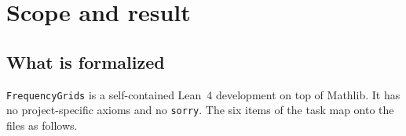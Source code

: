 \documentclass[11pt,a4paper]{article}
\newcommand{\code}[1]{\texttt{#1}}
\theoremstyle{definition}
\theoremstyle{remark}
\begin{document}
\begin{abstract}
Two discrepancies with the paper's numerics are proved or checked and reported in
\S\ref{sec:item1} and \S\ref{sec:item3}: (i) the bracketing interval
$(-0.9999,-0.0001)$ carries a sign change only for $1\le t\le 589$ and loses it from
$t=590$ onward --- the root exists for all $t\ge1$ but leaves the interval; (ii) the value
$s_2=-0.99941091795$ hard-coded in vf4 \S7.3--7.4 is the root at $t=100$, not at $t=1$.
The development is \code{sorry}-free and depends only on the three standard axioms
\code{propext}, \code{Classical.choice}, \code{Quot.sound}.
\end{abstract}

\tableofcontents

\section{Scope and result}

\subsection*{What is formalized}

\code{FrequencyGrids} is a self-contained Lean~4 development on top of Mathlib.  It has no
project-specific axioms and no \code{sorry}.  The six items of the task map onto the files
as follows.
\end{document}
